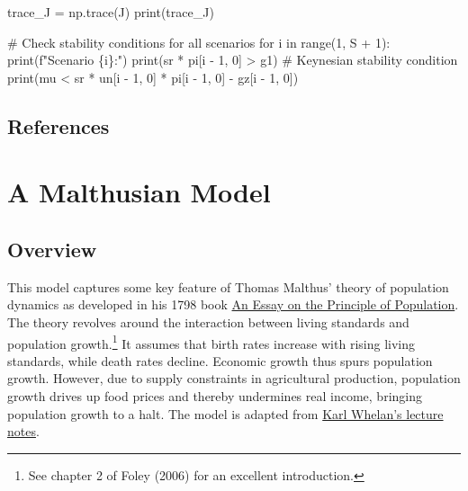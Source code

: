 \documentclass[
  letterpaper,
  DIV=11,
  numbers=noendperiod]{scrreprt}
\newenvironment{Shaded}{\begin{snugshade}}{\end{snugshade}}
\newcommand{\BuiltInTok}[1]{\textcolor[rgb]{0.00,0.23,0.31}{#1}}
\newcommand{\CommentTok}[1]{\textcolor[rgb]{0.37,0.37,0.37}{#1}}
\newcommand{\ControlFlowTok}[1]{\textcolor[rgb]{0.00,0.23,0.31}{#1}}
\newcommand{\DecValTok}[1]{\textcolor[rgb]{0.68,0.00,0.00}{#1}}
\newcommand{\KeywordTok}[1]{\textcolor[rgb]{0.00,0.23,0.31}{#1}}
\newcommand{\NormalTok}[1]{\textcolor[rgb]{0.00,0.23,0.31}{#1}}
\newcommand{\OperatorTok}[1]{\textcolor[rgb]{0.37,0.37,0.37}{#1}}
\newcommand{\SpecialCharTok}[1]{\textcolor[rgb]{0.37,0.37,0.37}{#1}}
\newcommand{\SpecialStringTok}[1]{\textcolor[rgb]{0.13,0.47,0.30}{#1}}
\begin{document}
\begin{tcolorbox}
\begin{Shaded}
\begin{Highlighting}[]
\NormalTok{trace\_J }\OperatorTok{=}\NormalTok{ np.trace(J)}
\BuiltInTok{print}\NormalTok{(trace\_J)}

\CommentTok{\# Check stability conditions for all scenarios}
\ControlFlowTok{for}\NormalTok{ i }\KeywordTok{in} \BuiltInTok{range}\NormalTok{(}\DecValTok{1}\NormalTok{, S }\OperatorTok{+} \DecValTok{1}\NormalTok{):}
    \BuiltInTok{print}\NormalTok{(}\SpecialStringTok{f"Scenario }\SpecialCharTok{\{}\NormalTok{i}\SpecialCharTok{\}}\SpecialStringTok{:"}\NormalTok{)}
    \BuiltInTok{print}\NormalTok{(sr }\OperatorTok{*}\NormalTok{ pi[i }\OperatorTok{{-}} \DecValTok{1}\NormalTok{, }\DecValTok{0}\NormalTok{] }\OperatorTok{\textgreater{}}\NormalTok{ g1)  }\CommentTok{\# Keynesian stability condition}
    \BuiltInTok{print}\NormalTok{(mu }\OperatorTok{\textless{}}\NormalTok{ sr }\OperatorTok{*}\NormalTok{ un[i }\OperatorTok{{-}} \DecValTok{1}\NormalTok{, }\DecValTok{0}\NormalTok{] }\OperatorTok{*}\NormalTok{ pi[i }\OperatorTok{{-}} \DecValTok{1}\NormalTok{, }\DecValTok{0}\NormalTok{] }\OperatorTok{{-}}\NormalTok{ gz[i }\OperatorTok{{-}} \DecValTok{1}\NormalTok{, }\DecValTok{0}\NormalTok{])}
\end{Highlighting}
\end{Shaded}

\end{tcolorbox}

\section{References}\label{references-10}

\chapter{A Malthusian Model}\label{sec-malthus}

\section{Overview}\label{overview-9}

This model captures some key feature of Thomas Malthus' theory of
population dynamics as developed in his 1798 book
\href{https://en.wikipedia.org/wiki/An_Essay_on_the_Principle_of_Population}{An
Essay on the Principle of Population}. The theory revolves around the
interaction between living standards and population growth.\footnote{See
  chapter 2 of Foley (2006) for an excellent introduction.} It assumes
that birth rates increase with rising living standards, while death
rates decline. Economic growth thus spurs population growth. However,
due to supply constraints in agricultural production, population growth
drives up food prices and thereby undermines real income, bringing
population growth to a halt. The model is adapted from
\href{https://karlwhelan.com/blog/?p=759}{Karl Whelan's lecture notes}.
\end{document}
